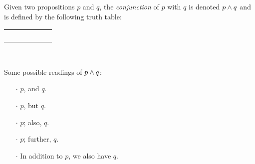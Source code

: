\begin{definition}[Conjunction]
    \begin{center}
        \begin{minipage}[t]{.55\linewidth}
            Given two propositions $p$ and $q$, the \emph{conjunction} of $p$ with $q$
            is denoted $p \wedge q$ and is defined by the following truth table:
            \begin{table}[H]
                \centering
                \label{tab:and}
                \begin{tabular}{|CcCc||Cc|}
                    \hline
                     &  &  \\ \hline
                    \thead{$\top$} & \thead{$\top$} &  \\
                    \thead{$\top$} & \thead{$\bot$} &  \\
                    \thead{$\bot$} & \thead{$\top$} &  \\
                    \thead{$\bot$} & \thead{$\bot$} &  \\ \hline
                \end{tabular}
            \end{table}
        \end{minipage}%
        \begin{minipage}[t]{.05\linewidth}
            ~
        \end{minipage}%
        \begin{minipage}[t]{.4\linewidth}
            Some possible readings of $p \wedge q$:\\
            \begin{itemize}
                \item[$\cdot$]
                    $p$, and $q$.
                \item[$\cdot$]
                    $p$, but $q$.
                \item[$\cdot$]
                    $p$; also, $q$.
                \item[$\cdot$]
                    $p$; further, $q$.
                \item[$\cdot$]
                    In addition to $p$, we also have $q$.
            \end{itemize}
        \end{minipage}
    \end{center}
\end{definition}



